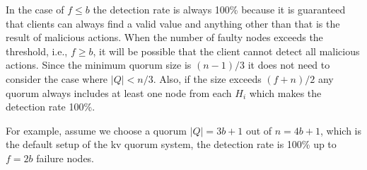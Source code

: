 In the case of $f \le b$ the detection rate is always 100\% because it is
guaranteed that clients can always find a valid value and anything
other than that is the result of malicious actions. When the number of
faulty nodes exceeds the threshold, i.e., $f \geq b$, it will be possible that
the client cannot detect all malicious actions. Since the minimum
quorum size is $(n-1)/3$ it does not need to consider the case where
$|Q| < n/3$. Also, if the size exceeds $(f+n)/2$ any quorum always
includes at least one node from each $H_i$ which makes the detection
rate 100\%. \\


For example, assume we choose a quorum $|Q| = 3b+1$ out of $n = 4b+1$,
which is the default setup of the kv quorum system, the detection rate
is 100\% up to $f = 2b$ failure nodes. \\

